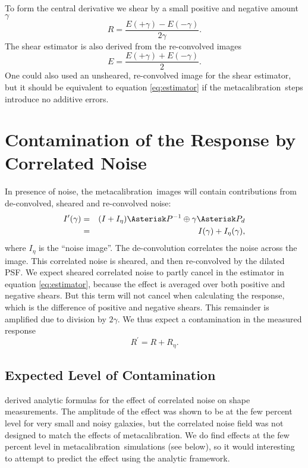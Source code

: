 \documentclass[usegraphicx,usenatbib]{mn2e}
\newcommand{\mcal}{metacalibration}
\begin{document}
To form the central derivative we shear by a small positive and negative
amount $\gamma$
\begin{equation} \label{eq:Rnum}
    R = \frac{E(+\gamma) - E(-\gamma)}{2 \gamma}.
\end{equation}
The shear estimator is also derived from the re-convolved
images
\begin{equation} \label{eq:estimator}
    E = \frac{E(+\gamma) + E(-\gamma)}{2}.
\end{equation}
One could also used an unsheared, re-convolved image for the
shear estimator, but it should be
equivalent to equation \ref{eq:estimator} if the \mcal\ steps
introduce no additive errors.

\section{Contamination of the Response by Correlated Noise} \label{sec:contam}

In presence of noise, the \mcal\ images will contain
contributions from de-convolved, sheared and re-convolved noise:
\begin{eqnarray}
    I^{\prime}(\gamma) & = & (I + I_\eta) \Asterisk P^{-1} \oplus \gamma \Asterisk P_{d} \nonumber \\
    & = & I(\gamma) + I_\eta(\gamma),
\end{eqnarray}
where $I_\eta$ is the ``noise image''.  The de-convolution correlates the noise
across the image.  This correlated noise is sheared, and then re-convolved by
the dilated PSF.  We expect sheared correlated noise to partly cancel in the
estimator in equation \ref{eq:estimator}, because the effect is
averaged over both positive and negative shears.  But this term will not cancel
when calculating the response, which is the difference of positive and negative
shears.  This remainder is amplified due to division by $2 \gamma$.
We thus expect a contamination in the measured response
\begin{equation}
    R^{\prime}  =  R + R_{\eta}.
\end{equation}

\subsection{Expected Level of Contamination}

\citep{HirataCorrNoise} derived analytic formulas for the effect of correlated
noise on shape measurements.  The amplitude of the effect was shown to be at
the few percent level for very small and noisy galaxies, but the correlated
noise field was not designed to match the effects of \mcal.  We do find effects
at the few percent level in \mcal\ simulations (see below), so it would
interesting to attempt to predict the effect using the analytic framework.
\end{document}
